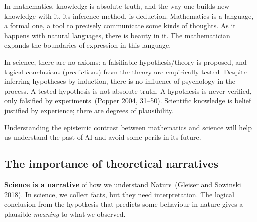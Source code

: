 \documentclass[
  letterpaper,
  a4paper,
  12pt,
  twoside,
  brazil,
  british,
  open=right]{scrbook}
\begin{document}
In mathematics, knowledge is absolute truth, and the way one builds new
knowledge with it, its inference method, is deduction. Mathematics is a
language, a formal one, a tool to precisely communicate some kinds of
thoughts. As it happens with natural languages, there is beauty in it.
The mathematician expands the boundaries of expression in this language.

In science, there are no axioms: a falsifiable hypothesis/theory is
proposed, and logical conclusions (predictions) from the theory are
empirically tested. Despite inferring hypotheses by induction, there is
no influence of psychology in the process. A tested hypothesis is not
absolute truth. A hypothesis is never verified, only falsified by
experiments~(Popper 2004,
31--50).
Scientific knowledge is belief justified by experience; there are
degrees of plausibility.

Understanding the epistemic contrast between mathematics and science
will help us understand the past of {AI} and avoid some perils in its
future.

\hypertarget{the-importance-of-theoretical-narratives}{%
\subsection{The importance of theoretical
narratives}\label{the-importance-of-theoretical-narratives}}

\textbf{Science is a narrative} of how we understand Nature~(Gleiser and
Sowinski
2018).
In science, we collect facts, but they need interpretation. The logical
conclusion from the hypothesis that predicts some behaviour in nature
gives a plausible \emph{meaning} to what we observed.
\end{document}
